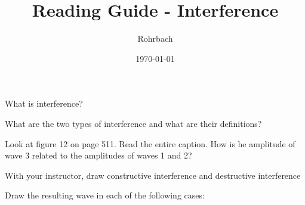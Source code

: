 \documentclass[10pt]{exam}
\title{Reading Guide - Interference}
\author{Rohrbach}
\date{\today}
\begin{document}
\maketitle

\begin{questions}



\question
  What is interference?
  \vs

\question
  What are the two types of interference and what are their definitions?
  \vs

\question
  Look at figure 12 on page 511.   Read the entire caption.  How is he amplitude of wave 3 related to the amplitudes of waves 1 and 2?
  \vs

\question
  With your instructor, draw constructive interference and destructive interference
  \vs

\end{questions}

\pagebreak

\noindent
Draw the resulting wave in each of the following cases:
\end{document}
